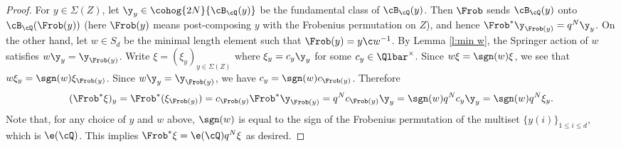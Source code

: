 \begin{proof}
For $y\in \Sigma(Z)$, let $\y_{y}\in \cohog{2N}{\cB_{\cQ}(y)}$ be the fundamental class of $\cB_{\cQ}(y)$. Then $\Frob$ sends $\cB_{\cQ}(y)$ onto $\cB_{\cQ}(\Frob(y))$ (here $\Frob(y)$ means post-composing $y$ with the Frobenius permutation on $Z$), and hence $\Frob^{*}\y_{\Frob(y)}=q^{N}\y_{y}$. On the other hand, let $w\in S_{d}$ be the minimal length element such that $\Frob(y)=y\c w^{-1}$. By Lemma \ref{l:min w}, the Springer action of $w$ satisfies $w\y_{y}=\y_{\Frob(y)}$. Write  $\xi=(\xi_{y})_{y\in \Sigma(Z)}$ where $\xi_{y}=c_{y}\y_{y}$ for some $c_{y}\in \Qlbar^{\times}$. Since $w\xi=\sgn(w)\xi$, we see that $w\xi_{y}=\sgn(w)\xi_{\Frob(y)}$. Since  $w\y_{y}=\y_{\Frob(y)}$, we have $c_{y}=\sgn(w)c_{\Frob(y)}$. Therefore
\begin{equation*}
(\Frob^{*}\xi)_{y}=\Frob^{*}(\xi_{\Frob(y)})=c_{\Frob(y)}\Frob^{*}\y_{\Frob(y)}=q^{N}c_{\Frob(y)}\y_{y}=\sgn(w)q^{N}c_{y}\y_{y}=\sgn(w)q^{N}\xi_{y}.
\end{equation*}Note that, for any choice of $y$ and $w$ above, $\sgn(w)$ is equal to the sign of the Frobenius permutation of the multiset $\{y(i)\}_{1\le i\le d}$, which is $\e(\cQ)$. This implies $\Frob^{*}\xi=\e(\cQ)q^{N}\xi$ as desired.
\end{proof}



